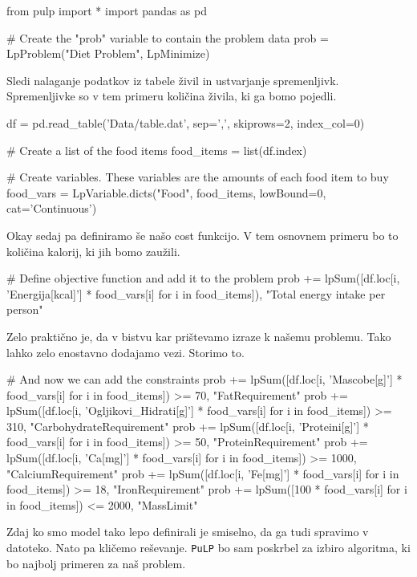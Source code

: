 \documentclass[a4paper]{article}
\begin{document}
\begin{pythonlst}
    from pulp import *
    import pandas as pd

    # Create the "prob"  variable to contain the problem data
    prob = LpProblem("Diet Problem", LpMinimize)
\end{pythonlst}

Sledi nalaganje podatkov iz tabele živil in ustvarjanje spremenljivk. Spremenljivke so v tem primeru
količina živila, ki ga bomo pojedli. 

\begin{pythonlst}
    df = pd.read_table('Data/table.dat', sep=',', skiprows=2, index_col=0)

    # Create a list of the food items
    food_items = list(df.index)

    # Create variables. These variables are the amounts of each food item to buy
    food_vars = LpVariable.dicts("Food", food_items, lowBound=0, cat='Continuous')
\end{pythonlst}

Okay sedaj pa definiramo še našo cost funkcijo. V tem osnovnem primeru bo to količina kalorij, ki jih
bomo zaužili.

\begin{pythonlst}
    # Define objective function and add it to the problem
    prob += lpSum([df.loc[i, 'Energija[kcal]'] * food_vars[i] for i in food_items]), "Total energy intake per person"
\end{pythonlst}

Zelo praktično je, da v bistvu kar prištevamo izraze k našemu problemu. Tako lahko zelo enostavno dodajamo
vezi. Storimo to.

\begin{pythonlst}
    # And now we can add the constraints
    prob += lpSum([df.loc[i, 'Mascobe[g]'] * food_vars[i] for i in food_items]) >= 70, "FatRequirement"
    prob += lpSum([df.loc[i, 'Ogljikovi_Hidrati[g]'] * food_vars[i] for i in food_items]) >= 310, "CarbohydrateRequirement"
    prob += lpSum([df.loc[i, 'Proteini[g]'] * food_vars[i] for i in food_items]) >= 50, "ProteinRequirement"
    prob += lpSum([df.loc[i, 'Ca[mg]'] * food_vars[i] for i in food_items]) >= 1000, "CalciumRequirement"
    prob += lpSum([df.loc[i, 'Fe[mg]'] * food_vars[i] for i in food_items]) >= 18, "IronRequirement"
    prob += lpSum([100 * food_vars[i] for i in food_items]) <= 2000, "MassLimit"
\end{pythonlst}

Zdaj ko smo model tako lepo definirali je smiselno, da ga tudi spravimo v datoteko. Nato pa kličemo 
reševanje. \texttt{PuLP} bo sam poskrbel za izbiro algoritma, ki bo najbolj primeren za naš problem.
\end{document}
